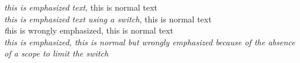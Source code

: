 \documentclass{article}
\begin{document}
\noindent\emph{this is emphasized text}, this is normal text\\
{\em this is emphasized text using a switch}, this is normal text\\
\emph this is wrongly emphasized, this is normal text\\ 
\em this is emphasized, this is normal but wrongly emphasized because
of the absence of a scope to limit the switch
\end{document}
